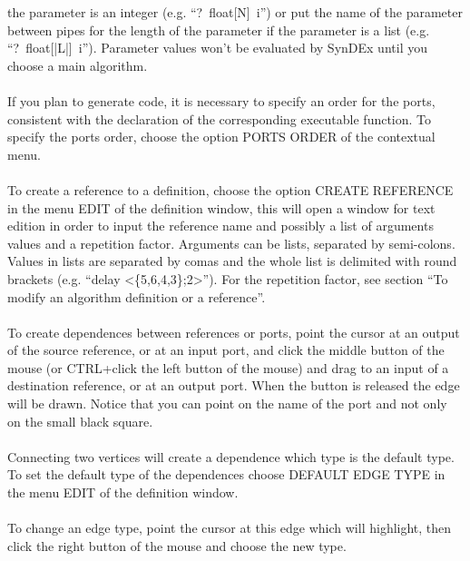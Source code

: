 \documentclass[11pt,twoside]{report}
\begin{document}
the parameter is an integer (e.g. ``?~float[N]~i'') or put the name of
the parameter between pipes for the length of the parameter if the
parameter is a list (e.g. ``?~float[|L|]~i''). Parameter
values won't be evaluated by SynDEx until you choose a main algorithm.\\\\
If you plan to generate code, it is necessary to specify an order for
the ports, consistent with the declaration of the corresponding
executable function. To specify the ports order, choose the option
PORTS ORDER of the contextual menu.\\\\ To create a reference to a
definition, choose the option CREATE REFERENCE in the menu EDIT of the
definition window, this will open a window for text edition in order
to input the reference name and possibly a list of arguments values
and a repetition factor. Arguments can be lists, separated by
semi-colons.  Values in lists are separated by comas and the whole
list is delimited with round brackets (e.g.  ``delay
<\{5,6,4,3\};2>''). For the repetition factor, see section ``To modify
an algorithm definition or a reference''.\\\\
To create dependences between references or ports, point the cursor at
an output of the source reference, or at an input port, and click the
middle button of the mouse (or CTRL+click the left button of the
mouse) and drag to an input of a destination reference, or at an
output port. When the button is released the edge will be drawn.
Notice that you can point on the name of the port and not only on the
small black square.\\\\ Connecting two vertices will create a
dependence which type is the default type. To set the default type of
the dependences choose DEFAULT EDGE TYPE in the menu EDIT of the
definition window.\\\\ To change an edge type, point the cursor at
this edge which will highlight, then click the right button of the
mouse and choose the new type.
\end{document}
